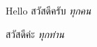 \documentclass[a4paper]{article}
\begin{document}
Hello {\rmfamily สวัสดีครับ \textit{ทุกคน}}

{\sffamily สวัสดีค่ะ \textit{ทุกท่าน}}
\end{document}
